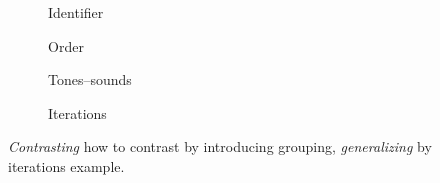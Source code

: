 \begin{frame}
  \begin{figure}
    \begin{subfigure}{0.3\columnwidth}
      \caption{Identifier}
    \end{subfigure}
    \begin{subfigure}{0.3\columnwidth}
      \caption{Order}
    \end{subfigure}
    \newline
    \begin{subfigure}{0.3\columnwidth}
      \caption{Tones--sounds}
    \end{subfigure}
    \begin{subfigure}{0.3\columnwidth}
      \caption{Iterations}
    \end{subfigure}
    \caption{\emph{Contrasting} how to contrast by introducing grouping,
      \emph{generalizing} by iterations example.}
  \end{figure}
\end{frame}

